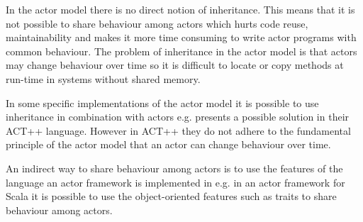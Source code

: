 In the actor model there is no direct notion of inheritance\cite{mackay1997has}. This means that it is not possible to share behaviour among actors which hurts code reuse, maintainability and makes it more time consuming to write actor programs with common behaviour. The problem of inheritance in the actor model is that actors may change behaviour over time so it is difficult to locate or copy methods at run-time in systems without shared memory\cite{kafura1989inheritance}.

In some specific implementations of the actor model it is possible to use inheritance in combination with actors e.g. \cite{kafura1989inheritance} presents a possible solution in their ACT++ language. However in ACT++ they do not adhere to the fundamental principle of the actor model that an actor can change behaviour over time. 

An indirect way to share behaviour among actors is to use the features of the language an actor framework is implemented in e.g. in an actor framework for Scala it is possible to use the object-oriented features such as traits to share behaviour among actors.

